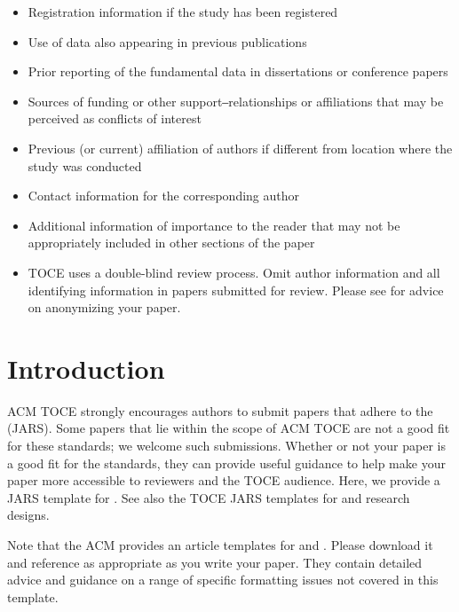 \documentclass[acmsmall]{acmart}
\begin{document}
\begin{itemize}
    \item Registration information if the study has been registered
    \item Use of data also appearing in previous publications
    \item Prior reporting of the fundamental data in dissertations or conference papers
    \item Sources of funding or other support‒relationships or affiliations that may be perceived as conflicts of interest
    \item Previous (or current) affiliation of authors if different from location where the study  was conducted
    \item Contact information for the corresponding author
    \item Additional information of importance to the reader that may not be appropriately included in other sections of the paper
    \item TOCE uses a double-blind review process. Omit author information and all identifying information in papers submitted for review. Please see \hyperlink{https://dl.acm.org/journal/toce/author-guidelines}{\color{blue}{TOCE’s Author Guidelines page}} for advice on anonymizing your paper.
\end{itemize}


\section{Introduction}
ACM TOCE strongly encourages authors to submit papers that adhere to the \hyperlink{https://apastyle.apa.org/jars/}{\color{blue}{American Psychological Association’s Journal Article Reporting Standards}}  (JARS).  Some papers that lie within the scope of ACM TOCE are not a good fit for these standards; we welcome such submissions. Whether or not your paper is a good fit for the standards, they can provide useful guidance to help make your paper more accessible to reviewers and the TOCE audience.
Here, we provide a JARS template for \hyperlink{https://apastyle.apa.org/jars/mixed-table-1.pdf}{\color{blue}{mixed-method research designs}}.  See also the TOCE JARS templates for \hyperlink{https://apastyle.apa.org/jars/quantitative}{\color{blue}{quantitative}} and \hyperlink{https://apastyle.apa.org/jars/qualitative}{\color{blue}{qualitative}} research designs.

Note that the ACM provides an article templates for \hyperlink{https://www.acm.org/binaries/content/assets/publications/taps/acm_submission_template.docx}{\color{blue}{Microsoft Word}} and \hyperlink{https://www.acm.org/binaries/content/assets/publications/consolidated-tex-template/acmart-master.zip}{\color{blue}{Latex}}. Please download it and reference as appropriate as you write your paper. They contain detailed advice and guidance on a range of specific formatting issues not covered in this template.
\end{document}
